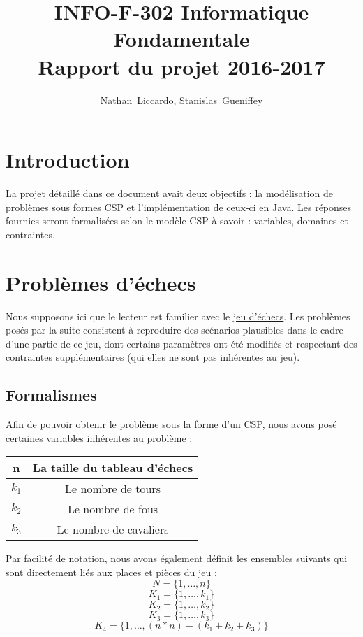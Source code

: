 \documentclass[a4paper]{article}
\title{INFO-F-302 Informatique Fondamentale \\ Rapport du projet 2016-2017}
\author{Nathan~Liccardo, Stanislas~Gueniffey}
\begin{document}
\maketitle

\section{Introduction}
La projet détaillé dans ce document avait deux objectifs : la modélisation de problèmes sous formes CSP et l'implémentation de ceux-ci en Java. Les réponses fournies seront formalisées selon le modèle CSP à savoir : variables, domaines et contraintes.

\section{Problèmes d'échecs}
Nous supposons ici que le lecteur est familier avec le \href{https://fr.wikipedia.org/wiki/%C3%89checs}{jeu d'échecs}. Les problèmes posés par la suite consistent à reproduire des scénarios plausibles dans le cadre d'une partie de ce jeu, dont certains paramètres ont été modifiés et respectant des contraintes supplémentaires (qui elles ne sont pas inhérentes au jeu).

\subsection{Formalismes}
Afin de pouvoir obtenir le problème sous la forme d'un CSP, nous avons posé certaines variables inhérentes au problème : 
\begin{center}
\begin{tabular}{|c|c|}
\hline
n & La taille du tableau d'échecs \\
\hline
$k_1$ & Le nombre de tours \\
\hline
$k_2$ & Le nombre de fous \\
\hline
$k_3$ & Le nombre de cavaliers  \\
\hline
\end{tabular}
\end{center}
Par facilité de notation, nous avons également définit les ensembles suivants qui sont directement liés aux places et pièces du jeu : 
\begin{equation}
N = \{1,\ldots,n\}
\end{equation}
\begin{equation}
K_1 = \{ 1,\ldots,k_1 \}
\end{equation}
\begin{equation}
K_2 = \{ 1,\ldots,k_2 \}
\end{equation}
\begin{equation}
K_3 = \{ 1,\ldots,k_3 \}
\end{equation}
\begin{equation}
K_4 = \{ 1,\ldots,(n*n)-(k_1+k_2+k_3) \}
\end{equation}
\end{document}
